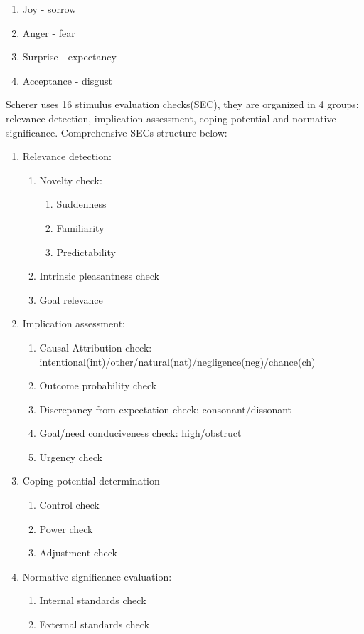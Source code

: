 \begin{enumerate}
	\item  Joy - sorrow
	\item  Anger - fear
	\item  Surprise - expectancy
	\item  Acceptance - disgust
\end{enumerate}

Scherer uses 16 stimulus evaluation checks(SEC), they are organized in 4 groups: relevance detection, implication assessment, coping potential and normative significance.
Comprehensive SECs structure below:

\begin{enumerate}
	\item  Relevance detection:
	\begin{enumerate}
		\item  Novelty check:
		\begin{enumerate}
			\item  Suddenness
			\item  Familiarity
			\item  Predictability
		\end{enumerate}
		\item  Intrinsic pleasantness check
		\item  Goal relevance
	\end{enumerate}
	\item  Implication assessment:
	\begin{enumerate}
		\item  Causal Attribution check: intentional(int)/other/natural(nat)/negligence(neg)/chance(ch)
		\item  Outcome probability check
		\item  Discrepancy from expectation check: consonant/dissonant
		\item  Goal/need conduciveness check: high/obstruct
		\item  Urgency check
	\end{enumerate}
	\item  Coping potential determination
	\begin{enumerate}
		\item  Control check
		\item  Power check
		\item  Adjustment check
	\end{enumerate}
	\item  Normative significance evaluation:
	\begin{enumerate}
		\item  Internal standards check
		\item  External standards check
	\end{enumerate}
\end{enumerate}

